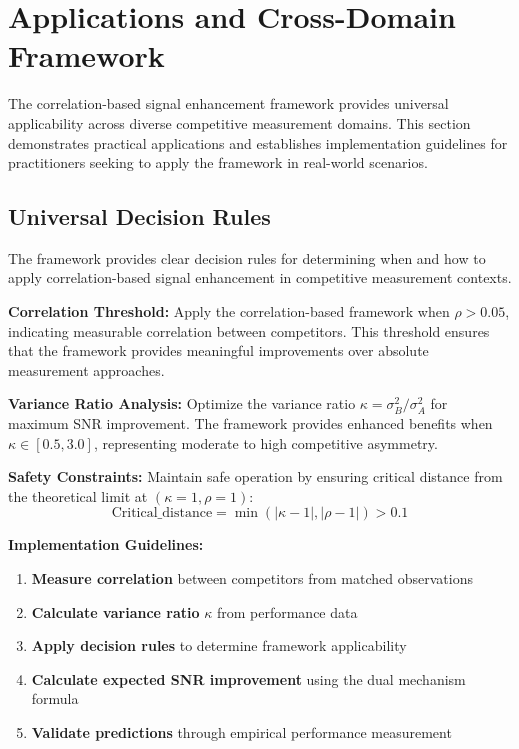 \section{Applications and Cross-Domain Framework}

The correlation-based signal enhancement framework provides universal applicability across diverse competitive measurement domains. This section demonstrates practical applications and establishes implementation guidelines for practitioners seeking to apply the framework in real-world scenarios.

\subsection{Universal Decision Rules}

The framework provides clear decision rules for determining when and how to apply correlation-based signal enhancement in competitive measurement contexts.

\textbf{Correlation Threshold:}
Apply the correlation-based framework when $\rho > 0.05$, indicating measurable correlation between competitors. This threshold ensures that the framework provides meaningful improvements over absolute measurement approaches.

\textbf{Variance Ratio Analysis:}
Optimize the variance ratio $\kappa = \sigma_B^2/\sigma_A^2$ for maximum SNR improvement. The framework provides enhanced benefits when $\kappa \in [0.5, 3.0]$, representing moderate to high competitive asymmetry.

\textbf{Safety Constraints:}
Maintain safe operation by ensuring critical distance from the theoretical limit at $(\kappa=1, \rho=1)$:
\begin{equation}
\text{Critical\_distance} = \min(|\kappa - 1|, |\rho - 1|) > 0.1
\end{equation}

\textbf{Implementation Guidelines:}
\begin{enumerate}
    \item \textbf{Measure correlation} between competitors from matched observations
    \item \textbf{Calculate variance ratio} $\kappa$ from performance data
    \item \textbf{Apply decision rules} to determine framework applicability
    \item \textbf{Calculate expected SNR improvement} using the dual mechanism formula
    \item \textbf{Validate predictions} through empirical performance measurement
\end{enumerate}

